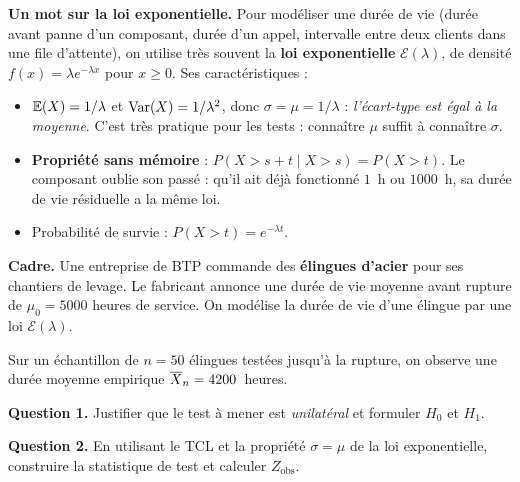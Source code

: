 \textbf{Un mot sur la loi exponentielle.} Pour modéliser une \og durée de vie \fg{} (durée avant panne d'un composant, durée d'un appel, intervalle entre deux clients dans une file d'attente), on utilise très souvent la \textbf{loi exponentielle} $\mathcal{E}(\lambda)$, de densité $f(x) = \lambda e^{-\lambda x}$ pour $x \ge 0$. Ses caractéristiques :
\begin{itemize}\setlength{\itemsep}{0.15em}
  \item $\mathbb{E}(X) = 1/\lambda$ et $\operatorname{Var}(X) = 1/\lambda^2$, donc $\boxed{\sigma = \mu = 1/\lambda}$ : \emph{l'écart-type est égal à la moyenne}. C'est très pratique pour les tests : connaître $\mu$ suffit à connaître $\sigma$.
  \item \textbf{Propriété sans mémoire} : $P(X > s+t \mid X > s) = P(X > t)$. Le composant \og oublie \fg{} son passé : qu'il ait déjà fonctionné $1$~h ou $1000$~h, sa durée de vie résiduelle a la même loi.
  \item Probabilité de survie : $P(X > t) = e^{-\lambda t}$.
\end{itemize}

\smallskip

\textbf{Cadre.} Une entreprise de BTP commande des \textbf{élingues d'acier} pour ses chantiers de levage. Le fabricant annonce une durée de vie moyenne avant rupture de $\mu_0 = 5000$ heures de service. On modélise la durée de vie d'une élingue par une loi $\mathcal{E}(\lambda)$.

Sur un échantillon de $n=50$ élingues testées jusqu'à la rupture, on observe une durée moyenne empirique $\overline{X}_n = 4200$~heures.

\medskip

\textbf{Question 1.} Justifier que le test à mener est \emph{unilatéral} et formuler $H_0$ et $H_1$.


\textbf{Question 2.} En utilisant le TCL et la propriété $\sigma = \mu$ de la loi exponentielle, construire la statistique de test et calculer $Z_{\text{obs}}$.


